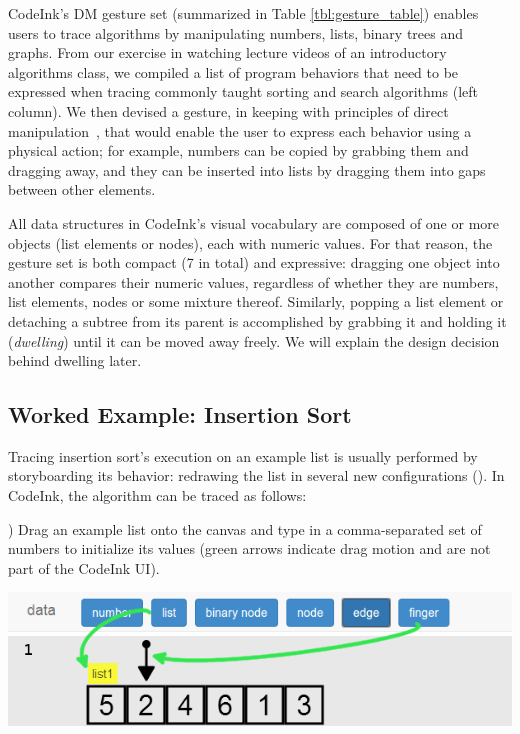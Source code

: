CodeInk's DM gesture set (summarized in Table \ref{tbl:gesture_table}) enables
users to trace algorithms by manipulating numbers, lists, binary trees and
graphs. From our exercise in watching lecture videos of an introductory
algorithms class, we compiled a list of program behaviors that need to be
expressed when tracing commonly taught sorting and search algorithms (left
column). We then devised a gesture, in keeping with principles of direct
manipulation~\cite{Shneiderman1982, Lee2012}, that would enable the user to
express each behavior using a physical action; for example, numbers can be
copied by grabbing them and dragging away, and they can be inserted into lists
by dragging them into gaps between other elements.

All data structures in CodeInk's visual vocabulary are composed of one or more
objects (list elements or nodes), each with numeric values. For that reason, the
gesture set is both compact (7 in total) and expressive: dragging one object
into another compares their numeric values, regardless of whether they are
numbers, list elements, nodes or some mixture thereof. Similarly, popping a list
element or detaching a subtree from its parent is accomplished by grabbing it
and holding it (\emph{dwelling}) until it can be moved away freely. We will
explain the design decision behind dwelling later.


\subsection{Worked Example: Insertion Sort}
Tracing insertion sort's execution on an example list is usually performed by
storyboarding its behavior: redrawing the list in several new configurations
(). In CodeInk, the algorithm can be traced as follows:

) Drag an example list onto the canvas and type in a comma-separated
set of numbers to initialize its values (green arrows indicate drag motion and
are not part of the CodeInk UI).

\vspace{-0.25em}
\noindent \includegraphics[width=0.7\columnwidth]{img/examples/insertion-1.png}
\vspace{0.5em}

